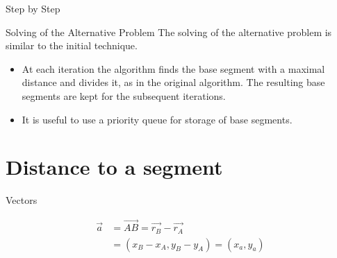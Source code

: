 \documentclass[10pt]{beamer}
\begin{document}
\begin{frame}{Step by Step}
	\begin{figure}[h]
		\end{figure}
\end{frame}

\begin{frame}{Solving of the Alternative Problem}
	The solving of the alternative problem is similar to the initial technique.
	\begin{itemize}
		\item At each iteration the algorithm finds the base segment with a maximal distance
		and divides it, as in the original algorithm. The resulting base segments are kept
		for the subsequent iterations.
		\item It is useful to use a priority queue for storage of base segments.  
	\end{itemize}
	
\end{frame}

\section{Distance to a segment}

\begin{frame}{Vectors}

		\begin{figure}[h]
		\end{figure}
		
		\begin{align*}
				\overrightarrow{a} & = \overrightarrow{AB} = \overrightarrow{r_B} - \overrightarrow{r_A} \\
				 & = (x_B-x_A,y_B-y_A) = (x_a,y_a) 	
		\end{align*}


\end{frame}
\end{document}
